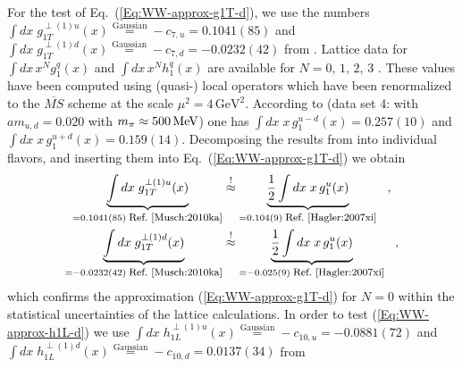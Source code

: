 \documentclass[a4paper,11pt]{article}
\newcommand{\ba}{\begin{eqnarray}}
\newcommand{\ea}{\end{eqnarray}}
\begin{document}
For the test of Eq.~(\ref{Eq:WW-approx-g1T-d}), we use the numbers 
$\int d x\;g_{1T}^{\perp(1)u}(x)\stackrel{\text{Gaussian}}{=}-c_{7,u}= 0.1041(85)$ 
and
$\int d x\;g_{1T}^{\perp(1)d}(x)\stackrel{\text{Gaussian}}{=}-c_{7,d}=-0.0232(42)$
from \cite{Musch:2010ka}. %
Lattice data for
$\int d x \,x^{N}g_1^q(x)$
\cite{Hagler:2003is,Hagler:2007xi} and
$\int d x \,x^{N}h_1^q(x)$
\cite{Gockeler:2005cj} are available for $N=0,\,1,\,2,\,3$ .
These values have been computed using (quasi-) local operators which 
have been renormalized to the $\overline{MS}$ scheme at the scale 
$\mu^2 = 4\,\text{GeV}^2$.
According to \cite{Hagler:2007xi} (data set 4:
with $am_{u,d} = 0.020$ with $m_\pi\approx 500\,{\rm MeV}$)
one has $\int d x \;x\,g_1^{u-d}(x)= 0.257(10)$ and
$\int d x \;x\,g_1^{u+d}(x)= 0.159(14)$.
Decomposing the results from  \cite{Hagler:2007xi} into
individual flavors, and inserting them into
Eq.~(\ref{Eq:WW-approx-g1T-d}) we obtain
\ba
        \underbrace{\int d x\;g_{1T}^{\perp(1)u}(x)}
        _{= 0.1041(85) \;\mbox{\footnotesize Ref.~\cite{Musch:2010ka}}}
        &\stackrel{!}{\approx}
        \underbrace{\frac{1}{2}\int d x\;x\,g_1^u(x)}
        _{= 0.104(9) \;\mbox{\footnotesize Ref.~\cite{Hagler:2007xi}}}
        \hspace{3mm} , \nonumber \\
        \underbrace{\int d x\;g_{1T}^{\perp(1)d}(x)}
        _{= -0.0232(42) \;\mbox{\footnotesize Ref.~\cite{Musch:2010ka}}}
        &\stackrel{!}{\approx}
        \underbrace{\frac{1}{2}\int d x\;x\,g_1^u(x)}
        _{= -0.025(9) \;\mbox{\footnotesize Ref.~\cite{Hagler:2007xi}}}
        \hspace{3mm}, 
        \label{Eq:test-WW-type-lattice-g1T}
\ea
which confirms the approximation (\ref{Eq:WW-approx-g1T-d}) for $N=0$
within the statistical uncertainties of the lattice calculations.
%
In order to test (\ref{Eq:WW-approx-h1L-d}) we use
$\int d x\;h_{1L}^{\perp(1)u}(x)\stackrel{\text{Gaussian}}{=}-c_{10,u} = -0.0881(72)$ and
$\int d x\;h_{1L}^{\perp(1)d}(x)\stackrel{\text{Gaussian}}{=}-c_{10,d} = 0.0137(34)$ from  \cite{Musch:2010ka}
\end{document}
